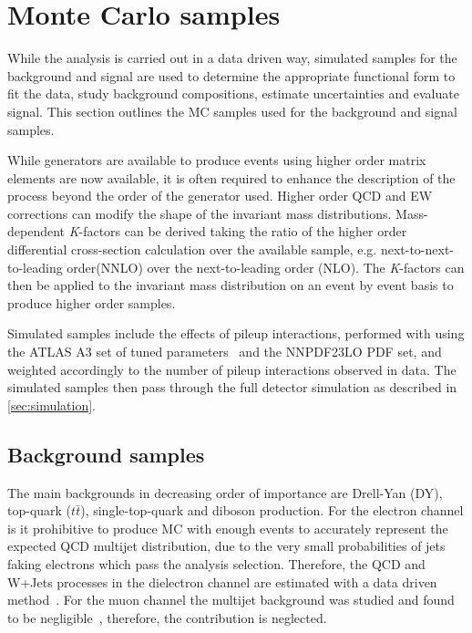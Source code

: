 \clearpage

\section{Monte Carlo samples}\label{sec:datamc:mc}
While the analysis is carried out in a data driven way, simulated samples for the background and signal are used to determine the appropriate functional form to fit the data, study background compositions, estimate uncertainties and evaluate signal. This section outlines the MC samples used for the background and signal samples.

While generators are available to produce events using higher order matrix elements are now available, it is often required to enhance the description of the process beyond the order of the generator used. Higher order QCD and EW corrections can modify the shape of the invariant mass distributions. Mass-dependent \emph{K}-factors can be derived taking the ratio of the higher order differential cross-section calculation over the available sample, e.g. next-to-next-to-leading order(NNLO) over the next-to-leading order (NLO). The \emph{K}-factors can then be applied to the invariant mass distribution on an event by event basis to produce higher order samples. 

Simulated samples include the effects of pileup interactions, performed with  using the ATLAS A3 set of tuned parameters~\cite{ATL-PHYS-PUB-2016-017} and the NNPDF23LO PDF set, and weighted accordingly to the number of pileup interactions observed in data. The simulated samples then pass through the full detector simulation as described in \cref{sec:simulation}. 

\subsection{Background samples}\label{sec:datamc:mc:bkg}
The main backgrounds in decreasing order of importance are Drell-Yan (DY), top-quark ($t\bar{t}$), single-top-quark and diboson production. For the electron channel is it prohibitive to produce MC with enough events to accurately represent the expected QCD multijet distribution, due to the very small probabilities of jets faking electrons which pass the analysis selection. Therefore, the QCD and W+Jets processes in the dielectron channel are estimated with a data driven method~\cite{EXOT-2016-05}. For the muon channel the multijet background was studied and found to be negligible~\cite{EXOT-2016-05}, therefore, the contribution is neglected. 

